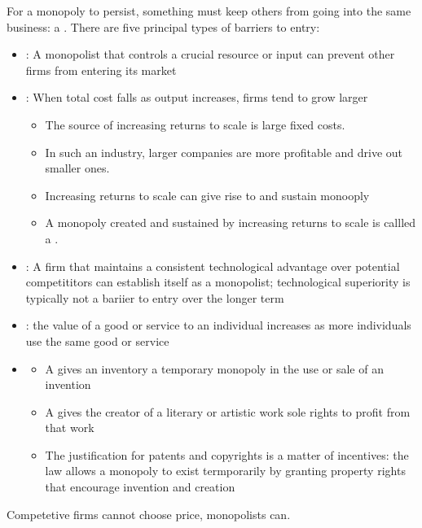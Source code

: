 \documentclass{article}
\begin{document}
For a monopoly to persist, something must keep others from going into the same business: a . There are five principal types of barriers to entry: 
\begin{itemize}
  \item {}: A monopolist that controls a crucial resource or input can prevent other firms from entering its market
  \item {}: When total cost falls as output increases, firms tend to grow larger 
  \begin{itemize}
    \item The source of increasing returns to scale is large fixed costs. 
    \item In such an industry, larger companies are more profitable and drive out smaller ones. 
    \item Increasing returns to scale can give rise to and sustain monooply 
    \item A monopoly created and sustained by increasing returns to scale is callled a . 
  \end{itemize}
  \item {}: A firm that maintains a consistent technological advantage over potential competititors can establish itself as a monopolist; technological superiority is typically not a bariier to entry over the longer term
  \item {}: the value of a good or service to an individual increases as more individuals use the same good or service
  \item {} 
  \begin{itemize}
    \item A  gives an inventory a temporary monopoly in the use or sale of an invention 
    \item A  gives the creator of a literary or artistic work sole rights to profit from that work 
    \item The justification for patents and copyrights is a matter of incentives: the law allows a monopoly to exist termporarily by granting property rights that encourage invention and creation
  \end{itemize}
\end{itemize}

\begin{remark}
  Competetive firms cannot choose price, monopolists can. 
\end{remark}
\end{document}
